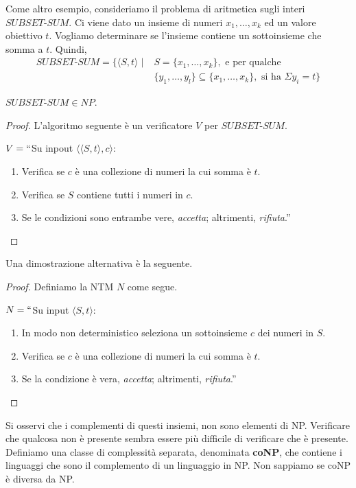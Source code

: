 \documentclass[12pt]{report}
\newcounter{theorem}
\begin{document}
Come altro esempio, consideriamo il problema di aritmetica sugli interi $SUBSET\text{-}SUM$. Ci viene dato un insieme di numeri $x_1, \dots, x_k$ ed un valore obiettivo $t$. Vogliamo determinare se l'insieme contiene un sottoinsieme che somma a $t$. Quindi,
\begin{align*}
	SUBSET\text{-}SUM = \{\langle S, t \rangle \mid &S = \{x_1, \dots, x_k\}, \text{ e per qualche } \\
	& \{y_1, \dots, y_l\} \subseteq \{x_1, \dots, x_k\}, \text{ si ha }\Sigma y_i = t\}
\end{align*}
\begin{theorem}{}{}
	$SUBSET\text{-}SUM \in NP$.
\end{theorem}
\begin{proof}
	L'algoritmo seguente è un verificatore $V$ per $SUBSET\text{-}SUM$.

	$V = ``$Su inpout $\langle \langle S, t \rangle, c \rangle$:
	\begin{enumerate}
		\item Verifica se $c$ è una collezione di numeri la cui somma è  $t$.
		\item Verifica se $S$ contiene tutti i numeri in $c$.
		\item Se le condizioni sono entrambe vere, \textit{accetta}; altrimenti, \textit{rifiuta}.''
	\end{enumerate}
\end{proof}
Una dimostrazione alternativa è la seguente.
\begin{proof}
	Definiamo la NTM $N$ come segue.

	$N = ``$Su input $\langle S, t \rangle$:
	\begin{enumerate}
		\item In modo non deterministico seleziona un sottoinsieme $c$ dei numeri in $S$.
		\item Verifica se $c$ è una collezione di numeri la cui somma è $t$.
		\item Se la condizione è vera, \textit{accetta}; altrimenti, \textit{rifiuta}.''
	\end{enumerate}
\end{proof}
Si osservi che i complementi di questi insiemi,  non sono elementi di NP. Verificare che qualcosa non è presente sembra essere più difficile di verificare che è presente. Definiamo una classe di complessità separata, denominata \textbf{coNP}, che contiene i linguaggi che sono il complemento di un linguaggio in NP. Non sappiamo se coNP è diversa da NP.
\end{document}
